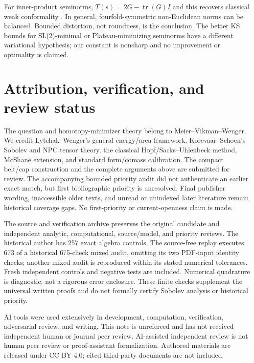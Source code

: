 \documentclass[11pt]{article}
\newcommand{\tr}{\operatorname{tr}}
\begin{document}
For inner-product seminorms, $T(s)=2G-\tr(G)I$ and this recovers classical
weak conformality \cite[Lemma~1.5]{su}. In general, fourfold-symmetric
non-Euclidean norms can be balanced. Bounded distortion, not roundness, is the
conclusion. The better KS bounds for SL(2)-minimal or Plateau-minimizing
seminorms \cite{lw} have a different variational hypothesis; our constant is
nonsharp and no improvement or optimality is claimed.

\section*{Attribution, verification, and review status}
The question and homotopy-minimizer theory belong to Meier--Vikman--Wenger.
We credit Lytchak--Wenger's general energy/area framework, Korevaar--Schoen's
Sobolev and NPC tensor theory, the classical Hopf/Sacks--Uhlenbeck method,
McShane extension, and standard form/comass calibration. The compact belt/cap
construction and the complete arguments above are submitted for review.
The accompanying bounded priority audit did not authenticate an earlier exact
match, but first bibliographic priority is unresolved. Final publisher wording,
inaccessible older texts, and unread or unindexed later literature remain
historical coverage gaps. No first-priority or current-openness claim is made.

The source and verification archive preserves the original candidate and
independent analytic, computational, source/model, and priority reviews.
The historical author has 257 exact algebra controls. The source-free replay
executes 673 of a historical 675-check mixed audit, omitting its two PDF-input
identity checks; another mixed audit is reproduced within its stated numerical
tolerances. Fresh independent controls and negative tests are included.
Numerical quadrature is diagnostic, not a rigorous error enclosure. These
finite checks supplement the universal written proofs and do not formally
certify Sobolev analysis or historical priority.

AI tools were used extensively in development, computation, verification,
adversarial review, and writing. This note is unrefereed and has not received
independent human or journal peer review. AI-assisted independent review is
not human peer review or proof-assistant formalization. Authored materials are
released under CC BY 4.0; cited third-party documents are not included.
\end{document}
